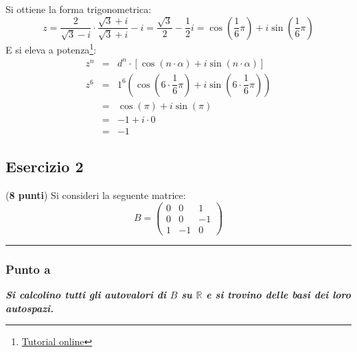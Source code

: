 \documentclass[a4paper]{article}
\newcommand{\longline}{\noindent\rule{\textwidth}{0.4pt}}
\begin{document}
	\noindent
	Si ottiene la forma trigonometrica:
	\begin{equation*}
		z = \dfrac{2}{\sqrt{3}-i} \cdot \dfrac{\sqrt{3}+i}{\sqrt{3}+i} - i = \dfrac{\sqrt{3}}{2} - \dfrac{1}{2}i = \cos\left(\dfrac{1}{6}\pi\right) + i \sin\left(\dfrac{1}{6}\pi\right)
	\end{equation*}
	E si eleva a potenza\footnote{\href{https://www.andreaminini.org/matematica/numeri-complessi/la-potenza-del-numero-complesso}{Tutorial online}}:
	\begin{equation*}
		\begin{array}{lll}
			z^{n} &=& d^{n} \cdot \left[\cos\left(n \cdot \alpha\right) + i \sin\left(n \cdot \alpha\right)\right] \\ [1em]
			z^{6} &=& 1^{6}\left(\cos\left(6 \cdot \dfrac{1}{6}\pi\right) + i \sin\left(6 \cdot \dfrac{1}{6}\pi\right)\right) \\[1em]
			&=& \cos\left(\pi\right) + i \sin\left(\pi\right) \\ [1em]
			&=& -1 + i \cdot 0 \\ [1em]
			&=& -1
		\end{array}
	\end{equation*}\newpage
	
	\subsection{Esercizio 2}
	
	(\textbf{8 punti}) Si consideri la seguente matrice:
	\begin{equation*}
		B = \begin{pmatrix}
			0 & 0 & 1 \\
			0 & 0 & -1 \\
			1 & -1 & 0
		\end{pmatrix}
	\end{equation*}
	
	\longline
	
	\subsubsection{Punto a}
	
	\textcolor{Green4}{\textbf{\emph{Si calcolino tutti gli autovalori di $B$ su $\mathbb{R}$ e si trovino delle basi dei loro autospazi.}}}\newline
	
\end{document}
